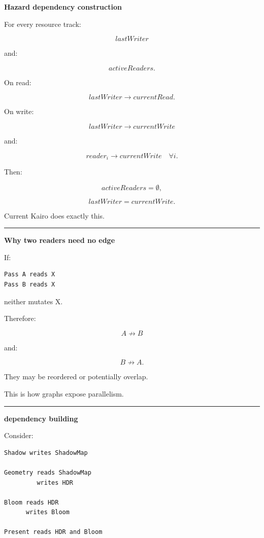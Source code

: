 \textbf{Hazard dependency construction}

For every resource track:

\[
lastWriter
\]

and:

\[
activeReaders.
\]

On read:

\[
lastWriter
\rightarrow
currentRead.
\]

On write:

\[
lastWriter
\rightarrow
currentWrite
\]

and:

\[
reader_i
\rightarrow
currentWrite
\quad\forall i.
\]

Then:

\[
activeReaders=\emptyset,
\]

\[
lastWriter=currentWrite.
\]

Current Kairo does exactly this.

\begin{center}\rule{0.5\linewidth}{0.5pt}\end{center}

\textbf{Why two readers need no edge}

If:

\begin{verbatim}
Pass A reads X
Pass B reads X
\end{verbatim}

neither mutates X.

Therefore:

\[
A
\not\rightarrow
B
\]

and:

\[
B
\not\rightarrow
A.
\]

They may be reordered or potentially overlap.

This is how graphs expose parallelism.

\begin{center}\rule{0.5\linewidth}{0.5pt}\end{center}

\textbf{dependency building}

Consider:

\begin{verbatim}
Shadow writes ShadowMap

Geometry reads ShadowMap
         writes HDR

Bloom reads HDR
      writes Bloom

Present reads HDR and Bloom
\end{verbatim}

